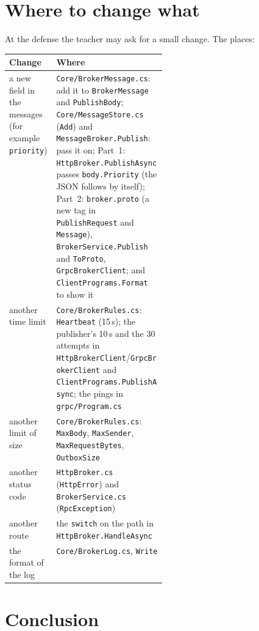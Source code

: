 \documentclass[11pt,a4paper]{article}
\newcommand{\code}[1]{{\frenchspacing\texttt{#1}}}
\begin{document}
\section{Where to change what}\label{sec:change}

At the defense the teacher may ask for a small change. The places:

\begin{center}
\small
\begin{tabularx}{\linewidth}{@{}>{\raggedright\arraybackslash}p{0.3\linewidth}>{\raggedright\arraybackslash}X@{}}
\toprule
Change & Where \\
\midrule
a new field in the messages (for example \code{priority}) &
  \code{Core/BrokerMessage.cs}: add it to \code{BrokerMessage} and \code{PublishBody};
  \code{Core/MessageStore.cs} (\code{Add}) and \code{MessageBroker.Publish}: pass it on;
  Part~1: \code{HttpBroker.PublishAsync} passes \code{body.Priority} (the JSON follows by itself);
  Part~2: \code{broker.proto} (a new tag in \code{PublishRequest} and \code{Message}),
  \code{BrokerService.Publish} and \code{ToProto}, \code{GrpcBrokerClient}; and \code{ClientPrograms.Format} to show it \\
another time limit & \code{Core/BrokerRules.cs}: \code{Heartbeat} (15\,s); the publisher's 10\,s and the 30 attempts in
  \code{HttpBrokerClient}/\code{GrpcBrokerClient} and \code{ClientPrograms.PublishAsync}; the pings in \code{grpc/Program.cs} \\
another limit of size & \code{Core/BrokerRules.cs}: \code{MaxBody}, \code{MaxSender}, \code{MaxRequestBytes}, \code{OutboxSize} \\
another status code & \code{HttpBroker.cs} (\code{HttpError}) and \code{BrokerService.cs} (\code{RpcException}) \\
another route & the \code{switch} on the path in \code{HttpBroker.HandleAsync} \\
the format of the log & \code{Core/BrokerLog.cs}, \code{Write} \\
\bottomrule
\end{tabularx}
\end{center}

\section{Conclusion}
\end{document}
